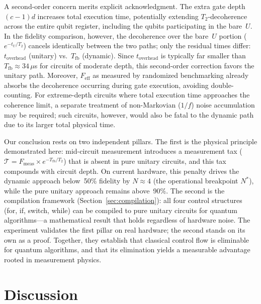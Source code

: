 \documentclass[11pt]{article}
\begin{document}
A second-order concern merits explicit acknowledgment.
The extra gate depth $(c{-}1)d$ increases total execution time, potentially extending $T_2$-decoherence across the entire qubit register, including the qubits participating in the bare~$U$.
In the fidelity comparison, however, the decoherence over the bare~$U$ portion ($e^{-t_U/T_2}$) cancels identically between the two paths; only the residual times differ: $t_{\text{overhead}}$ (unitary) vs.\ $T_{\text{fb}}$ (dynamic).
Since $t_{\text{overhead}}$ is typically far smaller than $T_{\text{fb}} \approx 34\,\mu$s for circuits of moderate depth, this second-order correction favors the unitary path.
Moreover, $F_{\text{eff}}$ as measured by randomized benchmarking already absorbs the decoherence occurring during gate execution, avoiding double-counting.
For extreme-depth circuits where total execution time approaches the coherence limit, a separate treatment of non-Markovian ($1/f$) noise accumulation may be required; such circuits, however, would also be fatal to the dynamic path due to its larger total physical time.

Our conclusion rests on two independent pillars.
The first is the physical principle demonstrated here: mid-circuit measurement introduces a measurement tax ($\mathcal{T} = F_\text{meas} \times e^{-T_\text{fb}/T_2}$) that is absent in pure unitary circuits, and this tax compounds with circuit depth.
On current hardware, this penalty drives the dynamic approach below~50\% fidelity by $N \approx 4$ (the operational breakpoint $N^*$), while the pure unitary approach remains above~90\%.
The second is the compilation framework (Section~\ref{sec:compilation}): all four control structures (for, if, switch, while) can be compiled to pure unitary circuits for quantum algorithms---a mathematical result that holds regardless of hardware noise.
The experiment validates the first pillar on real hardware; the second stands on its own as a proof.
Together, they establish that classical control flow is eliminable for quantum algorithms, and that its elimination yields a measurable advantage rooted in measurement physics.

\section{Discussion}
\end{document}
